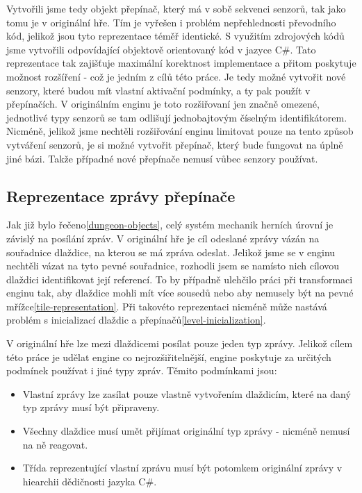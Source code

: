 Vytvořili jsme tedy objekt přepínač, který má v sobě sekvenci senzorů, tak jako tomu je v originální hře.
Tím je vyřešen i problém nepřehlednosti převodního kód, jelikož jsou tyto reprezentace téměř identické.
S využitím zdrojových kódů jsme vytvořili odpovídající objektově orientovaný kód v jazyce C\#. Tato reprezentace
tak zajišťuje maximální korektnost implementace a přitom poskytuje možnost rozšíření - což je jedním z cílů této práce. 
Je tedy možné vytvořit nové senzory, které budou mít vlastní aktivační podmínky, a ty pak použít v přepínačích.
V originálním enginu je toto rozšiřovaní jen značně omezené, jednotlivé typy senzorů se tam odlišují jednobajtovým číselným identifikátorem.
Nicméně, jelikož jsme nechtěli rozšiřování enginu limitovat pouze na tento způsob vytváření senzorů, je si možné vytvořit přepínač, který
bude fungovat na úplně jiné bázi. Takže případné nové přepínače nemusí vůbec senzory používat. 

\subsection{Reprezentace zprávy přepínače}

Jak již bylo řečeno\vref{dungeon-objects}, celý systém mechanik herních úrovní je závislý na posílání zpráv. 
V originální hře je cíl odeslané zprávy vázán na souřadnice dlaždice, na kterou se má zpráva odeslat. 
Jelikož jsme se v enginu nechtěli vázat na tyto pevné souřadnice, rozhodli jsem se namísto nich
cílovou dlaždici identifikovat její referencí. To by případně ulehčilo práci při transformaci enginu tak, aby
dlaždice mohli mít více sousedů nebo aby nemusely být na pevné mřížce\vref{tile-representation}.
Při takovéto reprezentaci nicméně může nastává problém s inicializací dlaždic a přepínačů\vref{level-inicialization}.

V originální hře lze mezi dlaždicemi posílat pouze jeden typ zprávy. Jelikož cílem této práce je udělat engine
co nejrozšiřitelnější, engine poskytuje za určitých podmínek používat i jiné typy zpráv.
Těmito podmínkami jsou:
\begin{itemize}
\item Vlastní zprávy lze zasílat pouze vlastně vytvořením dlaždicím, které na daný typ zprávy musí být připraveny.
\item Všechny dlaždice musí umět přijímat originální typ zprávy - nicméně nemusí na ně reagovat.
\item Třída reprezentující vlastní zprávu musí být potomkem originální zprávy v hiearchii dědičnosti jazyka C\#.
\end{itemize}

